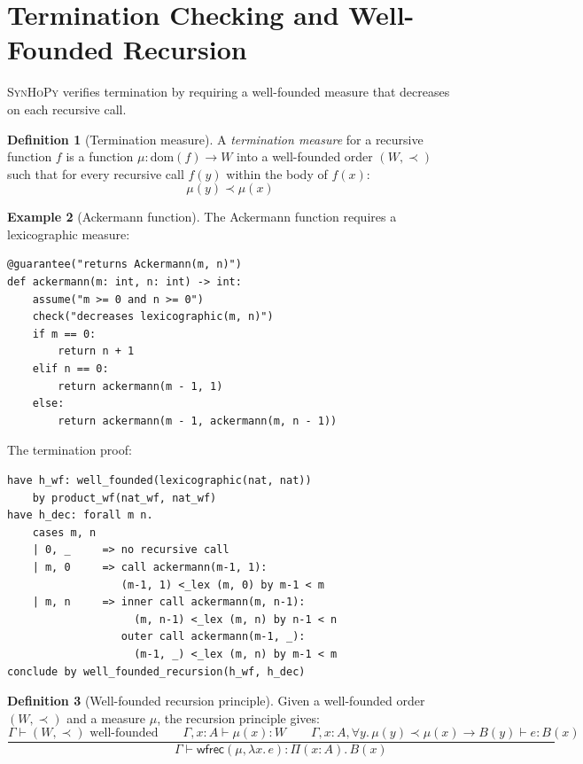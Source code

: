 \documentclass[11pt,a4paper]{report}
\theoremstyle{definition}
\newtheorem{definition}{Definition}[chapter]
\newtheorem{example}[definition]{Example}
\theoremstyle{plain}
\newcommand{\synhopy}{\textsc{SynHoPy}}
\begin{document}
\section{Termination Checking and Well-Founded Recursion}
\label{sec:termination}

\synhopy{} verifies termination by requiring a well-founded measure that decreases
on each recursive call.

\begin{definition}[Termination measure]
A \emph{termination measure} for a recursive function $f$ is a function
$\mu : \mathrm{dom}(f) \to W$ into a well-founded order $(W, \prec)$ such that
for every recursive call $f(y)$ within the body of $f(x)$:
\[
  \mu(y) \prec \mu(x)
\]
\end{definition}

\begin{example}[Ackermann function]
The Ackermann function requires a lexicographic measure:
\begin{lstlisting}[style=synhopy]
@guarantee("returns Ackermann(m, n)")
def ackermann(m: int, n: int) -> int:
    assume("m >= 0 and n >= 0")
    check("decreases lexicographic(m, n)")
    if m == 0:
        return n + 1
    elif n == 0:
        return ackermann(m - 1, 1)
    else:
        return ackermann(m - 1, ackermann(m, n - 1))
\end{lstlisting}

The termination proof:
\begin{lstlisting}[style=proof]
have h_wf: well_founded(lexicographic(nat, nat))
    by product_wf(nat_wf, nat_wf)
have h_dec: forall m n.
    cases m, n
    | 0, _     => no recursive call
    | m, 0     => call ackermann(m-1, 1):
                  (m-1, 1) <_lex (m, 0) by m-1 < m
    | m, n     => inner call ackermann(m, n-1):
                    (m, n-1) <_lex (m, n) by n-1 < n
                  outer call ackermann(m-1, _):
                    (m-1, _) <_lex (m, n) by m-1 < m
conclude by well_founded_recursion(h_wf, h_dec)
\end{lstlisting}
\end{example}

\begin{definition}[Well-founded recursion principle]
Given a well-founded order $(W, \prec)$ and a measure $\mu$, the recursion
principle gives:
\[
  \frac{
    \Gamma \vdash (W, \prec) \text{ well-founded}
    \qquad
    \Gamma, x : A \vdash \mu(x) : W
    \qquad
    \Gamma, x : A, \forall y.\, \mu(y) \prec \mu(x) \to B(y) \vdash e : B(x)
  }{
    \Gamma \vdash \mathsf{wfrec}(\mu, \lambda x.\, e) : \Pi(x : A).\, B(x)
  }
\]
\end{definition}
\end{document}
